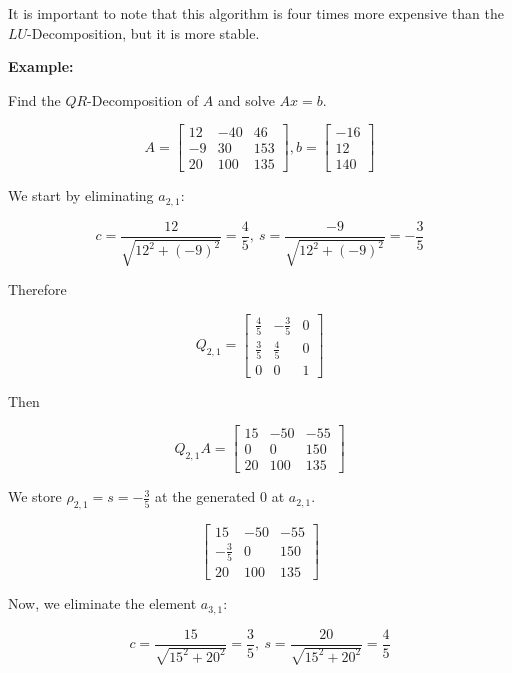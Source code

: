 It is important to note that this algorithm is four times more expensive than the \(LU\)-Decomposition, but it is more stable.

\textbf{Example:}

Find the \(QR\)-Decomposition of \(A\) and solve \(Ax = b\). 

\[
    A = 
    \begin{bmatrix}
        12 & -40 & 46 \\ 
        -9 & 30 & 153 \\ 
        20 & 100 & 135
    \end{bmatrix}
    , 
    b = 
    \begin{bmatrix}
       -16 \\ 
       12 \\ 
       140
    \end{bmatrix}
\]


We start by eliminating \(a_{2,1}\): 

\[
    c = \frac{12}{\sqrt{12^2 + (-9)^2}} = \frac{4}{5}, \ 
    s = \frac{-9}{\sqrt{12^2 + (-9)^2}} = - \frac{3}{5}
\]

Therefore 

\[
    Q_{2,1} =
    \begin{bmatrix}
        \frac{4}{5} & - \frac{3}{5} & 0 \\ 
        \frac{3}{5} & \frac{4}{5} & 0 \\ 
        0 & 0 & 1
    \end{bmatrix}
\]

Then

\[
    Q_{2,1}A =
    \begin{bmatrix}
        15 & -50 & -55 \\ 
        0 & 0 & 150 \\ 
        20 & 100 & 135
    \end{bmatrix}
\]

We store \(\rho_{2,1} = s = - \frac{3}{5}\) at the generated 0 at \(a_{2,1}\).

\[
    \begin{bmatrix}
        15 & -50 & -55 \\ 
        - \frac{3}{5} & 0 & 150 \\ 
        20 & 100 & 135
    \end{bmatrix}
\]

Now, we eliminate the element \(a_{3, 1}\):

\[
    c = \frac{15}{\sqrt{15^2 + 20^2}} = \frac{3}{5}, \ 
    s = \frac{20}{\sqrt{15^2 + 20^2}} = \frac{4}{5}
\]

